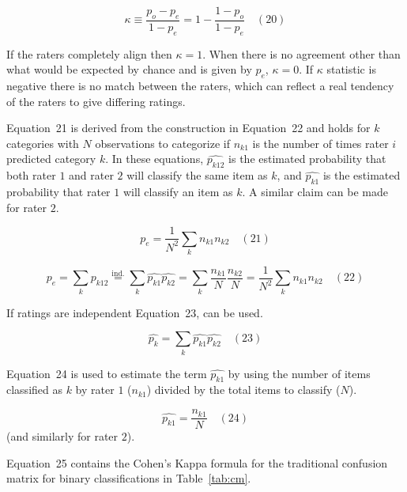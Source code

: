 \documentclass[sn-mathphys-num]{sn-jnl}%
\begin{document}
\begin{equation}
	\kappa \equiv {\frac {p_{o}-p_{e}}{1-p_{e}}}=1-{\frac {1-p_{o}}{1-p_{e}}}
	\quad\left(20\right)
\end{equation}

If the raters completely align then $\kappa = 1$. When there is no agreement other than what would be expected by chance and is given by $p_{e}$, $\kappa = 0$. If $\kappa$ statistic is negative \cite{sim2005kappa} there is no match between the raters, which can reflect a real tendency of the raters to give differing ratings.

Equation~21 is derived from the construction in Equation~22 and holds for $k$ categories with $N$ observations to categorize if $n_{k1}$ is the number of times rater $i$ predicted category $k$. In these equations, ${\widehat{p_{k12}}}$ is the estimated probability that both rater $1$ and rater $2$ will classify the same item as $k$, and ${\widehat {p_{k1}}}$ is the estimated probability that rater $1$ will classify an item as $k$. A similar claim can be made for rater $2$.

\begin{equation}
	p_{e}={\frac {1}{N^{2}}}\sum_{k}n_{k1}n_{k2}
	\quad\left(21\right)
\end{equation}

\begin{equation}
	p_{e}=\sum_{k}{\widehat {p_{k12}}}{\overset{\text{ind.}}{=}}\sum_{k}{\widehat {p_{k1}}}{\widehat {p_{k2}}}=\sum_{k}{\frac {n_{k1}}{N}}{\frac {n_{k2}}{N}}={\frac {1}{N^{2}}}\sum_{k}n_{k1}n_{k2}
	\quad\left(22\right)
\end{equation}

If ratings are independent Equation~23, can be used.

\begin{equation}
	\textstyle{\widehat{p_{k}}}=\sum_{k}{\widehat{p_{k1}}}{\widehat {p_{k2}}}
	\quad\left(23\right)
\end{equation}

Equation~24 is used to estimate the term $\widehat{p_{k1}}$ by using the number of items classified as $k$ by rater $1$ ($n_{k1}$) divided by the total items to classify ($N$).

\begin{equation}
	\widehat {p_{k1}}=\frac{n_{k1}}{N}
	\quad\left(24\right)
\end{equation}
 (and similarly for rater $2$).
 
Equation~25 contains the Cohen's Kappa formula \cite{chicco2021matthews} for the traditional confusion matrix for binary classifications in Table~\ref{tab:cm}.
\end{document}
